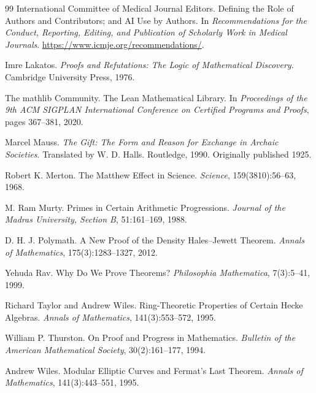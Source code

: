 \documentclass[11pt]{book}
\theoremstyle{definition}
\theoremstyle{remark}
\begin{document}
\begin{thebibliography}{99}
 International Committee of Medical Journal Editors. Defining the Role of Authors and Contributors; and AI Use by Authors. In \emph{Recommendations for the Conduct, Reporting, Editing, and Publication of Scholarly Work in Medical Journals}. \url{https://www.icmje.org/recommendations/}.

 Imre Lakatos. \emph{Proofs and Refutations: The Logic of Mathematical Discovery}. Cambridge University Press, 1976.

 The mathlib Community. The Lean Mathematical Library. In \emph{Proceedings of the 9th ACM SIGPLAN International Conference on Certified Programs and Proofs}, pages 367--381, 2020.

 Marcel Mauss. \emph{The Gift: The Form and Reason for Exchange in Archaic Societies}. Translated by W. D. Halls. Routledge, 1990. Originally published 1925.

 Robert K. Merton. The Matthew Effect in Science. \emph{Science}, 159(3810):56--63, 1968.

 M. Ram Murty. Primes in Certain Arithmetic Progressions. \emph{Journal of the Madras University, Section B}, 51:161--169, 1988.

 D. H. J. Polymath. A New Proof of the Density Hales--Jewett Theorem. \emph{Annals of Mathematics}, 175(3):1283--1327, 2012.

 Yehuda Rav. Why Do We Prove Theorems? \emph{Philosophia Mathematica}, 7(3):5--41, 1999.

 Richard Taylor and Andrew Wiles. Ring-Theoretic Properties of Certain Hecke Algebras. \emph{Annals of Mathematics}, 141(3):553--572, 1995.

 William P. Thurston. On Proof and Progress in Mathematics. \emph{Bulletin of the American Mathematical Society}, 30(2):161--177, 1994.

 Andrew Wiles. Modular Elliptic Curves and Fermat's Last Theorem. \emph{Annals of Mathematics}, 141(3):443--551, 1995.

\end{thebibliography}
\end{document}

